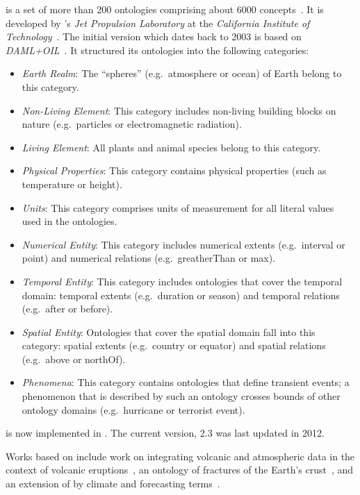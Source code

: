  is a set of more than 200 ontologies comprising about 6000 concepts~\cite{SWEET2,SWEETWeb}. It is developed by 's \emph{Jet Propulsion Laboratory} at the \emph{California Institute of Technology}~\cite{nasa-jpl}. The initial version which dates back to 2003 is based on \emph{DAML+OIL}~\cite{DAML+OIL,SWEET1}. It structured its ontologies into the following categories:
\begin{itemize}
  \item \emph{Earth Realm}: The ``spheres'' (e.g.\ atmosphere or ocean) of Earth belong to this category.
  \item \emph{Non-Living Element}: This category includes non-living building blocks on nature (e.g.\ particles or electromagnetic radiation).
  \item \emph{Living Element}: All plants and animal species belong to this category.
  \item \emph{Physical Properties}: This category contains physical properties (such as temperature or height).
  \item \emph{Units}: This category comprises units of measurement for all literal values used in the ontologies.
  \item \emph{Numerical Entity}: This category includes numerical extents (e.g.\ interval or point) and numerical relations (e.g.\ greatherThan or max).
  \item \emph{Temporal Entity}: This category includes ontologies that cover the temporal domain: temporal extents (e.g.\ duration or season) and temporal relations (e.g.\ after or before).
  \item \emph{Spatial Entity}: Ontologies that cover the spatial domain fall into this category: spatial extents (e.g.\ country or equator) and spatial relations (e.g.\ above or northOf).
  \item \emph{Phenomena}: This category contains ontologies that define transient events; a phenomenon that is described by such an ontology crosses bounds of other ontology domains (e.g.\ hurricane or terrorist event).
\end{itemize}

 is now implemented in . The current version,  2.3 was last updated in 2012.

Works based on  include work on integrating volcanic and atmospheric data in the context of volcanic eruptions~\cite{sweet_example1}, an ontology of fractures of the Earth's crust~\cite{sweet_example2}, and an extension of  by climate and forecasting terms~\cite{sweet_example3}.

